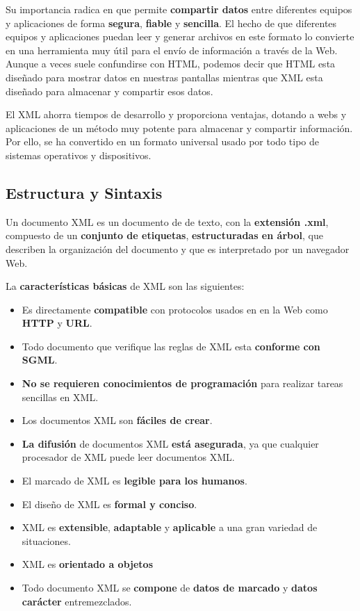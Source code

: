 Su importancia radica en que permite \textbf{compartir datos} entre diferentes equipos y aplicaciones de forma \textbf{segura}, \textbf{fiable} y \textbf{sencilla}. El hecho de que diferentes equipos y aplicaciones puedan leer y generar archivos en este formato lo convierte en una herramienta muy útil para el envío de información a través de la Web. Aunque a veces suele confundirse con HTML, podemos decir que HTML esta diseñado para mostrar datos en nuestras pantallas mientras que XML esta diseñado para almacenar y compartir esos datos.

El XML ahorra tiempos de desarrollo y proporciona ventajas, dotando a webs y aplicaciones de un método muy potente para almacenar y compartir información. Por ello, se ha convertido en un formato universal usado por todo tipo de sistemas operativos y dispositivos.

\subsection{Estructura y Sintaxis}
Un documento XML es un documento de de texto, con la \textbf{extensión .xml}, compuesto de un \textbf{conjunto de etiquetas}, \textbf{estructuradas en árbol}, que describen la organización del documento y que es interpretado por un navegador Web.

La \textbf{características básicas} de XML son las siguientes:

\begin{itemize}
    \item Es directamente \textbf{compatible} con protocolos usados en en la Web como \textbf{HTTP} y \textbf{URL}.
    \item Todo documento que verifique las reglas de XML esta \textbf{conforme con SGML}.
    \item \textbf{No se requieren conocimientos de programación} para realizar tareas sencillas en XML.
    \item Los documentos XML son\textbf{ fáciles de crear}.
    \item \textbf{La difusión} de documentos XML \textbf{está asegurada}, ya que cualquier procesador de XML puede leer documentos XML.
    \item El marcado de XML es \textbf{legible para los humanos}.
    \item El diseño de XML es \textbf{formal y conciso}.
    \item XML es \textbf{extensible}, \textbf{adaptable} y \textbf{aplicable} a una gran variedad de situaciones.
    \item XML es \textbf{orientado a objetos}
    \item Todo documento XML se \textbf{compone} de \textbf{datos de marcado} y \textbf{datos carácter} entremezclados.
\end{itemize}


